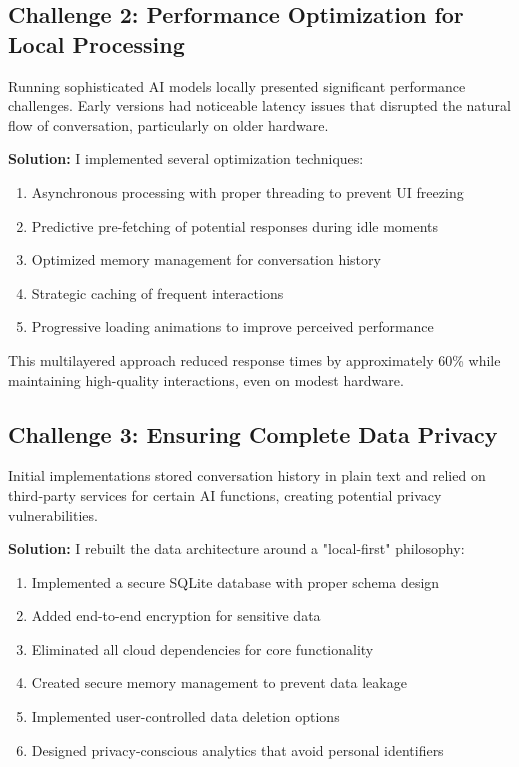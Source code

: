 \documentclass[12pt]{article}
\begin{document}
\subsection{Challenge 2: Performance Optimization for Local Processing}

Running sophisticated AI models locally presented significant performance challenges. Early versions had noticeable latency issues that disrupted the natural flow of conversation, particularly on older hardware.

\textbf{Solution:} I implemented several optimization techniques:

\begin{enumerate}
    \item Asynchronous processing with proper threading to prevent UI freezing
    \item Predictive pre-fetching of potential responses during idle moments
    \item Optimized memory management for conversation history
    \item Strategic caching of frequent interactions
    \item Progressive loading animations to improve perceived performance
\end{enumerate}

This multilayered approach reduced response times by approximately 60\% while maintaining high-quality interactions, even on modest hardware.

\subsection{Challenge 3: Ensuring Complete Data Privacy}

Initial implementations stored conversation history in plain text and relied on third-party services for certain AI functions, creating potential privacy vulnerabilities.

\textbf{Solution:} I rebuilt the data architecture around a "local-first" philosophy:

\begin{enumerate}
    \item Implemented a secure SQLite database with proper schema design
    \item Added end-to-end encryption for sensitive data
    \item Eliminated all cloud dependencies for core functionality
    \item Created secure memory management to prevent data leakage
    \item Implemented user-controlled data deletion options
    \item Designed privacy-conscious analytics that avoid personal identifiers
\end{enumerate}
\end{document}
